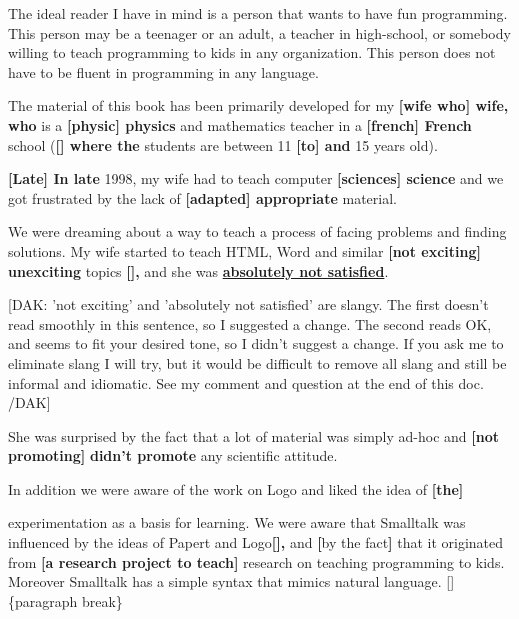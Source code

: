 \documentclass[12pt,a4paper]{article}
\begin{document}
The ideal reader I have in mind is a person that wants to have fun programming. This person may be a teenager or an adult, a teacher in high-school, or somebody willing to teach programming to kids in any organization. This person does not have to be fluent in programming in any language. 





The material of this book has been primarily developed for my\textbf{ [wife who] wife, who }is a \textbf{[physic] physics }and mathematics teacher in a\textbf{ [french] French }school (\textbf{[] where the }students are between 11\textbf{ [to] and }15 years old). 





\textbf{[Late] In late }1998, my wife had to teach computer\textbf{ [sciences] science }and we got frustrated by the lack of\textbf{ [adapted] appropriate }material. 


We were dreaming about a way to teach a process of facing problems and finding solutions. My wife started to teach HTML, Word and similar \textbf{[not exciting] }\textbf{{unexciting }}topics\textbf{ [], }and she was \textbf{\uline{absolutely not satisfied}}. 





{[DAK: 'not exciting' and '}{absolutely not satisfied' are }{slangy.  The first  doesn't read smoothly in this sentence, so I suggested a change. } The second reads OK, and seems to fit your desired tone, so I didn't suggest a change.  If you ask me to eliminate slang I will try, but it would be difficult to remove all slang and still be informal and idiomatic.  See my comment and question at the end of this doc. /DAK]


\begin{flushleft}

\end{flushleft}


She was surprised by the fact that a lot of material was simply ad-hoc and \textbf{[not promoting] }\textbf{{didn't promote }}any scientific attitude.





In addition we were aware of the work on Logo and liked the idea of \textbf{[}\textbf{the}\textbf{]}


experimentation as a basis for learning. We were aware that Smalltalk was influenced by the ideas of Papert and Logo\textbf{[], }and \textbf{[}by the fact\textbf{]} that it originated from\textbf{ [a research project to teach] }research on teaching programming to kids. Moreover Smalltalk has a simple syntax that mimics natural language. [] \{paragraph break\}
\end{document}
